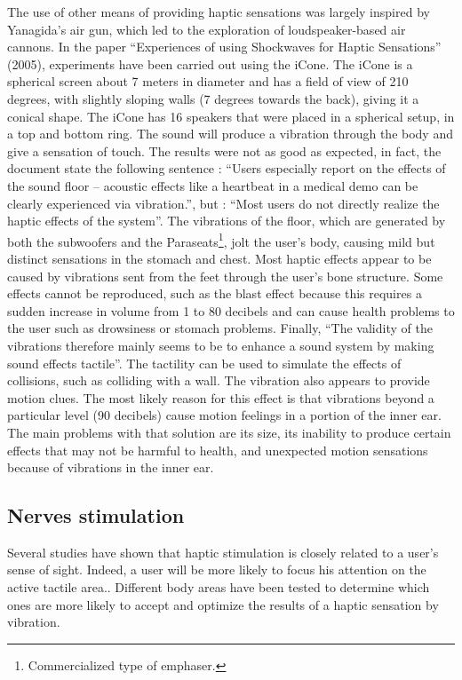 \documentclass[12pt, a4paper]{article}
\begin{document}
\begin{multicols}{2}
The use of other means of providing haptic sensations was largely inspired by Yanagida's air gun, which led to the exploration of loudspeaker-based air cannons\cite{soundAndHapic2}. In the paper “Experiences of using Shockwaves for Haptic Sensations” (2005), experiments have been carried out using the iCone. The iCone is a spherical screen about 7 meters in diameter and has a field of view of 210 degrees, with slightly sloping walls (7 degrees towards the back), giving it a conical shape. The iCone has 16 speakers that were placed in a spherical setup, in a top and bottom ring. The sound will produce a vibration through the body and give a sensation of touch. The results were not as good as expected, in fact, the document state the following sentence : “Users especially report on the effects of the sound floor – acoustic effects like a heartbeat in a medical demo can be clearly experienced via vibration.”, but : “Most users do not directly realize the haptic effects of the system”. The vibrations of the floor, which are generated by both the subwoofers and the Paraseats\footnote{Commercialized type of emphaser.}, jolt the user's body, causing mild but distinct sensations in the stomach and chest. Most haptic effects appear to be caused by vibrations sent from the feet through the user's bone structure. Some effects cannot be reproduced, such as the blast effect because this requires a sudden increase in volume from 1 to 80 decibels and can cause health problems to the user such as drowsiness or stomach problems\cite{ISO-vibration}. Finally, “The validity of the vibrations therefore mainly seems to be to enhance a sound system by making sound effects tactile”. The tactility can be used to simulate the effects of collisions, such as colliding with a wall. The vibration also appears to provide motion clues. The most likely reason for this effect is that vibrations beyond a particular level (90 decibels) cause motion feelings in a portion of the inner ear\cite{soundAndHapic2}. The main problems with that solution are its size, its inability to produce certain effects that may not be harmful to health, and unexpected motion sensations because of vibrations in the inner ear.

\subsection{Nerves stimulation}

Several studies have shown that haptic stimulation is closely related to a user's sense of sight. Indeed, a user will be more likely to focus his attention on the active tactile area.\cite{humancomputer}.
Different body areas have been tested to determine which ones are more likely to accept and optimize the results of a haptic sensation by vibration\cite{humancomputer}.


\end{multicols}
\end{document}
